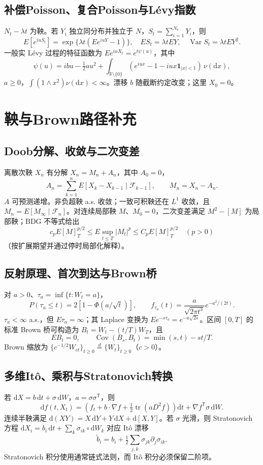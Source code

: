 \documentclass[../main.tex]{subfiles}
\begin{document}
\subsection{补偿Poisson、复合Poisson与Lévy指数}
$N_t-\lambda t$ 为鞅。若 $Y_i$ 独立同分布并独立于 $N$，$S_t=\sum_{i=1}^{N_t}Y_i$，则
\[
E[e^{iuS_t}]=\exp\{\lambda t(Ee^{iuY}-1)\},\quad
ES_t=\lambda tEY,\quad\operatorname{Var}S_t=\lambda tEY^2.
\]
一般实 Lévy 过程的特征函数为 $Ee^{iuX_t}=e^{t\psi(u)}$，其中
\[
\psi(u)=ibu-\tfrac12a u^2+
\int_{\mathbb R\setminus\{0\}}(e^{iux}-1-iux\bm1_{|x|<1})\,\nu(\mathrm dx),
\]
$a\ge0$，$\int(1\wedge x^2)\nu(\mathrm dx)<\infty$。漂移 $b$ 随截断约定改变；这里 $X_0=0$。
\section{鞅与Brown路径补充}
\subsection{Doob分解、收敛与二次变差}
离散次鞅 $X_n$ 有分解 $X_n=M_n+A_n$，其中 $A_0=0$，
\[
A_n=\sum_{k=1}^nE[X_k-X_{k-1}\mid\mathcal F_{k-1}],\qquad M_n=X_n-A_n.
\]
$A$ 可预测递增。非负超鞅 a.s. 收敛；一致可积鞅还在 $L^1$ 收敛，且 $M_n=E[M_\infty\mid\mathcal F_n]$。对连续局部鞅 $M$、$M_0=0$，二次变差满足 $M^2-[M]$ 为局部鞅；BDG 不等式给出
\[
c_pE[M]_T^{p/2}\le E\sup_{t\le T}|M_t|^p\le C_pE[M]_T^{p/2}\quad(p>0)
\]
（按扩展期望并通过停时局部化解释）。
\subsection{反射原理、首次到达与Brown桥}
对 $a>0$、$\tau_a=\inf\{t:W_t=a\}$，
\[
P(\tau_a\le t)=2[1-\Phi(a/\sqrt t)],\qquad
f_{\tau_a}(t)=\frac a{\sqrt{2\pi t^3}}e^{-a^2/(2t)}.
\]
$\tau_a<\infty$ a.s.，但 $E\tau_a=\infty$；其 Laplace 变换为 $Ee^{-s\tau_a}=e^{-a\sqrt{2s}}$。区间 $[0,T]$ 的标准 Brown 桥可构造为 $B_t=W_t-(t/T)W_T$，且
\[
EB_t=0,\qquad\operatorname{Cov}(B_s,B_t)=\min(s,t)-st/T.
\]
Brown 缩放为 $\{c^{-1/2}W_{ct}\}_{t\ge0}\overset d=\{W_t\}_{t\ge0}$（$c>0$）。
\subsection{多维Itô、乘积与Stratonovich转换}
若 $\mathrm dX=b\,\mathrm dt+\sigma\,\mathrm dW$，$a=\sigma\sigma^{\mathsf T}$，则
\[
\mathrm df(t,X_t)=\left(f_t+b\cdot\nabla f+\tfrac12\operatorname{tr}(aD^2f)\right)\mathrm dt
+\nabla f^{\mathsf T}\sigma\,\mathrm dW.
\]
连续半鞅满足 $\mathrm d(XY)=X\,\mathrm dY+Y\,\mathrm dX+\mathrm d[X,Y]$。若 $\sigma$ 光滑，则 Stratonovich 方程 $\mathrm dX_i=b_i\,\mathrm dt+\sum_k\sigma_{ik}\circ\mathrm dW_k$ 对应 Itô 漂移
\[
\widetilde b_i=b_i+\tfrac12\sum_{j,k}\sigma_{jk}\partial_j\sigma_{ik}.
\]
Stratonovich 积分使用通常链式法则，而 Itô 积分必须保留二阶项。
\end{document}
